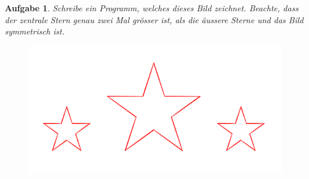 \documentclass{article}
\newtheorem{aufgabe}{Aufgabe}[section]
\begin{document}
\begin{aufgabe} \label{proportionen}
Schreibe ein Programm, welches dieses Bild zeichnet. Beachte, dass der zentrale Stern genau zwei Mal grösser ist, als die äussere Sterne und das Bild symmetrisch ist.
\begin{figure}[H]
\centering
\includegraphics[width=0.9\linewidth]{pictures/stern-proportion-symmetrie.png}
\end{figure}
\end{aufgabe}
\end{document}
